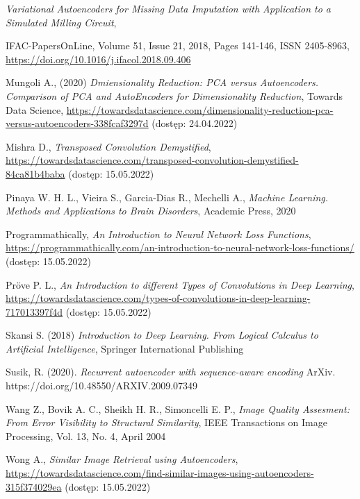 \documentclass[12pt]{mwbk}
\theoremstyle{plain}
\theoremstyle{definition}
\theoremstyle{remark}
\begin{document}
\begin{thebibliography}{99}
\emph{Variational Autoencoders for Missing Data Imputation with Application to a Simulated Milling Circuit},

IFAC-PapersOnLine,
 Volume 51, Issue 21,
 2018,
 Pages 141-146,
 ISSN 2405-8963, \url{https://doi.org/10.1016/j.ifacol.2018.09.406}

 Mungoli A., (2020) \emph{Dmiensionality Reduction: PCA versus Autoencoders. Comparison of PCA and AutoEncoders for Dimensionality Reduction}, Towards Data Science, \url{https://towardsdatascience.com/dimensionality-reduction-pca-versus-autoencoders-338fcaf3297d} (dostęp: 24.04.2022)

 Mishra D., \emph{Transposed Convolution Demystified}, \url{https://towardsdatascience.com/transposed-convolution-demystified-84ca81b4baba} (dostęp: 15.05.2022)



 Pinaya W. H. L., Vieira S., Garcia-Dias R., Mechelli A., \emph{Machine Learning. Methods and Applications to Brain Disorders}, Academic Press,
2020

 Programmathically, \emph{An Introduction to Neural Network Loss Functions}, \url{https://programmathically.com/an-introduction-to-neural-network-loss-functions/} (dostęp: 15.05.2022)

 Pröve P. L., \emph{An Introduction to different Types of Convolutions in Deep Learning}, \url{https://towardsdatascience.com/types-of-convolutions-in-deep-learning-717013397f4d} (dostęp: 15.05.2022)

 Skansi S. (2018) \emph{Introduction to Deep Learning. From Logical Calculus to Artificial Intelligence}, Springer International Publishing

 Susik, R. (2020). \emph{Recurrent autoencoder with sequence-aware encoding} ArXiv. https://doi.org/10.48550/ARXIV.2009.07349 

 Wang Z., Bovik A. C., Sheikh H. R., Simoncelli E. P., \emph{Image Quality Assesment: From Error Visibility to Structural Similarity}, IEEE Transactions on Image Processing, Vol. 13, No. 4, April 2004

 Wong A., \emph{Similar Image Retrieval using Autoencoders}, \url{https://towardsdatascience.com/find-similar-images-using-autoencoders-315f374029ea} (dostęp: 15.05.2022)

\end{thebibliography}
\end{document}
